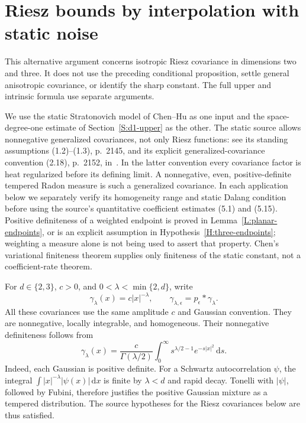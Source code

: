 \documentclass[12pt,oneside,openany]{book}
\numberwithin{equation}{section}
\theoremstyle{nogostyle}
\theoremstyle{definition}
\newcommand{\ud}{\,\mathrm{d}}
\begin{document}
\section{Riesz bounds by interpolation with static noise}
\label{S:static-holder}

This alternative argument concerns isotropic Riesz covariance in dimensions two
and three. It does not use the preceding conditional proposition, settle general
anisotropic covariance, or identify the sharp constant. The full upper and
intrinsic formula use separate arguments.

We use the static Stratonovich model of Chen--Hu as one input and the
space-degree-one estimate of Section~\ref{S:d1-upper} as the other. The static
source allows nonnegative generalized covariances, not only Riesz functions: see
its standing assumptions (1.2)--(1.3), p.~2145, and its explicit
generalized-covariance convention (2.18), p.~2152,
in~\cite{chen.hu:25:hyperbolic}. In the latter convention every covariance
factor is heat regularized before its defining limit. A nonnegative, even,
positive-definite tempered Radon measure is such a generalized covariance. In
each application below we separately verify its homogeneity range and static
Dalang condition before using the source's quantitative coefficient estimates
(5.1) and (5.15). Positive definiteness of a weighted endpoint is proved in
Lemma~\ref{L:planar-endpoints}, or is an explicit assumption in
Hypothesis~\ref{H:three-endpoints}; weighting a measure alone is not being used
to assert that property. Chen's variational finiteness theorem supplies only
finiteness of the static constant, not a coefficient-rate theorem.

For $d \in \{2,3\}$, $c > 0$, and $0 < \lambda < \min\{2,d\}$, write
\[
  \gamma_\lambda(x)=c|x|^{-\lambda},\qquad
  \gamma_{\lambda,\epsilon}=p_\epsilon*\gamma_\lambda.
\]
All these covariances use the same amplitude $c$ and Gaussian convention. They
are nonnegative, locally integrable, and homogeneous. Their nonnegative
definiteness follows from
\[
  \gamma_\lambda(x)=\frac{c}{\Gamma(\lambda/2)}
  \int_0^\infty s^{\lambda/2-1}e^{-s|x|^2}\ud s.
\]
Indeed, each Gaussian is positive definite. For a Schwartz autocorrelation
$\psi$, the integral $\int |x|^{-\lambda}|\psi(x)|\ud x$ is finite by $\lambda <
d$ and rapid decay. Tonelli with $|\psi|$, followed by Fubini, therefore
justifies the positive Gaussian mixture as a tempered distribution. The source
hypotheses for the Riesz covariances below are thus satisfied.
\end{document}
